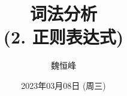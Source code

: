 \documentclass[]{beamer}
\title[词法分析]{词法分析 \\ (2. 正则表达式)}
\author[魏恒峰]{\large 魏恒峰}
\institute{hfwei@nju.edu.cn}
\date{2023年03月08日 (周三)}
\begin{document}
\maketitle




\thankyou{}

\end{document}
